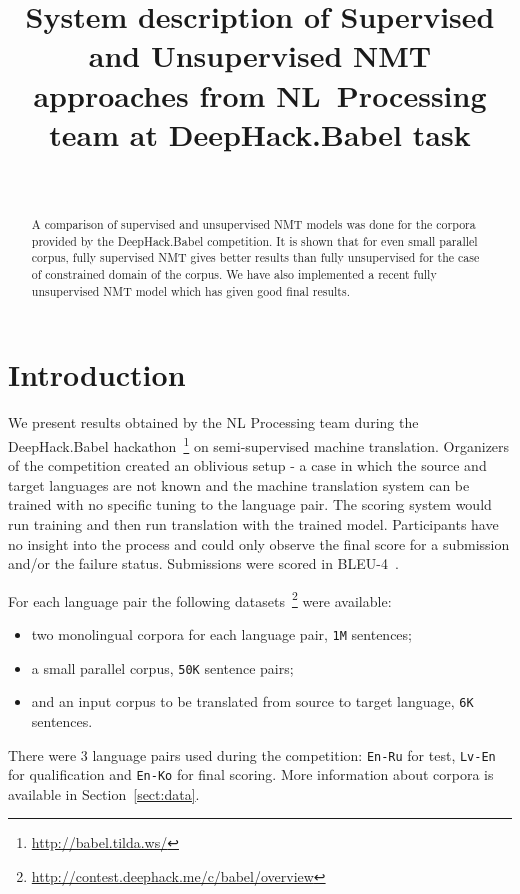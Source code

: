 \documentclass[]{article}
\begin{document}
\title{\bf System description of Supervised and Unsupervised NMT approaches from {NL~Processing} team at DeepHack.Babel task}
\author{ \hfill  {}\\
\AND
         \hfill {}
}

\maketitle
\pagestyle{empty}

\begin{abstract}
  A comparison of supervised and unsupervised NMT models was done for the corpora provided by the DeepHack.Babel competition.
  It is shown that for even small parallel corpus, fully supervised NMT gives better results than fully unsupervised for the case of constrained domain of the corpus.
  We have also implemented a recent fully unsupervised NMT model which has given good final results.
\end{abstract}

\section{Introduction}
\label{sect:intro}

We present results obtained by the NL Processing team during the DeepHack.Babel hackathon~\footnote{\url{http://babel.tilda.ws/}} on semi-supervised machine translation.
Organizers of the competition created an oblivious setup - a case in which the source and target languages are not known and the machine translation system can be trained with no specific tuning to the language pair.
The scoring system would run training and then run translation with the trained model.
Participants have no insight into the process and could only observe the final score for a submission and/or the failure status.
Submissions were scored in BLEU-4~\citep{papineni2002bleu}.

For each language pair the following datasets~\footnote{\url{http://contest.deephack.me/c/babel/overview}} were available:
\begin{itemize}
  \item two monolingual corpora for each language pair, {\tt 1M} sentences;
  \item a small parallel corpus, {\tt 50K} sentence pairs;
  \item and an input corpus to be translated from source to target language, {\tt 6K} sentences.
\end{itemize}
There were 3 language pairs used during the competition: {\tt En-Ru} for test, {\tt Lv-En} for qualification and {\tt En-Ko} for final scoring.
More information about corpora is available in Section~\ref{sect:data}.
\end{document}
